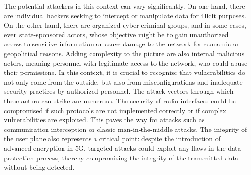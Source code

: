 \documentclass[english]{article}
\begin{document}
The potential attackers in this context can vary significantly. On one hand,
there are individual hackers seeking to intercept or manipulate data for
illicit purposes. On the other hand, there are organized cyber-criminal groups,
and in some cases, even state-sponsored actors, whose objective might be to
gain unauthorized access to sensitive information or cause damage to the
network for economic or geopolitical reasons. Adding complexity to the picture
are also internal malicious actors, meaning personnel with legitimate access to
the network, who could abuse their permissions. In this context, it is crucial
to recognize that vulnerabilities do not only come from the outside, but also
from misconfigurations and inadequate security practices by authorized
personnel. The attack vectors through which these actors can strike are
numerous. The security of radio interfaces could be compromised if such
protocols are not implemented correctly or if complex vulnerabilities are
exploited. This paves the way for attacks such as communication interception or
classic man-in-the-middle attacks. The integrity of the user plane also
represents a critical point: despite the introduction of advanced encryption in
5G, targeted attacks could exploit any flaws in the data protection process,
thereby compromising the integrity of the transmitted data without being
detected.
\end{document}
